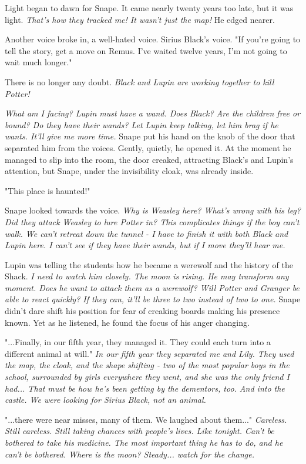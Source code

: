 \documentclass[a4paper,11pt]{article}
\begin{document}
Light began to dawn for Snape. It came nearly twenty years too late, but it was light. \emph{That's how they tracked me! It wasn't just the map!} He edged nearer.

Another voice broke in, a well-hated voice. Sirius Black's voice. "If you're going to tell the story, get a move on Remus. I've waited twelve years, I'm not going to wait much longer."

There is no longer any doubt. \emph{Black and Lupin are working together to kill Potter!}

\emph{What am I facing? Lupin must have a wand. Does Black? Are the children free or bound? Do they have their wands? Let Lupin keep talking, let him brag if he wants. It'll give me more time.} Snape put his hand on the knob of the door that separated him from the voices. Gently, quietly, he opened it. At the moment he managed to slip into the room, the door creaked, attracting Black's and Lupin's attention, but Snape, under the invisibility cloak, was already inside.

"This place is haunted!"

Snape looked towards the voice. \emph{Why is Weasley here? What's wrong with his leg? Did they attack Weasley to lure Potter in? This complicates things if the boy can't walk. We can't retreat down the tunnel - I have to finish it with both Black and Lupin here. I can't see if they have their wands, but if I move they'll hear me.}

Lupin was telling the students how he became a werewolf and the history of the Shack. \emph{I need to watch him closely. The moon is rising. He may transform any moment. Does he want to attack them as a werewolf? Will Potter and Granger be able to react quickly? If they can, it'll be three to two instead of two to one.} Snape didn't dare shift his position for fear of creaking boards making his presence known. Yet as he listened, he found the focus of his anger changing.

"...Finally, in our fifth year, they managed it. They could each turn into a different animal at will." \emph{In our fifth year they separated me and Lily. They used the map, the cloak, and the shape shifting - two of the most popular boys in the school, surrounded by girls everywhere they went, and she was the only friend I had... That must be how he's been getting by the dementors, too. And into the castle. We were looking for Sirius Black, not an animal.}

"...there were near misses, many of them. We laughed about them..." \emph{Careless. Still careless. Still taking chances with people's lives. Like tonight. Can't be bothered to take his medicine. The most important thing he has to do, and he can't be bothered. Where is the moon? Steady... watch for the change.}
\end{document}
